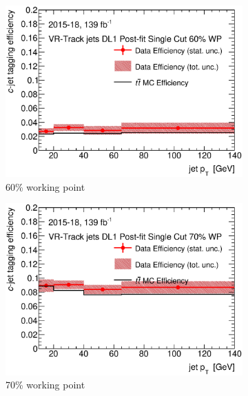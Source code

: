 \newpage
\begin{figure}[H]
	\centering
	\begin{subfigure}[t]{.35\linewidth}
		\includegraphics[width=1\textwidth]{FTAG_plots/DL1allVRJetsDec/eff60.eps}
		\caption{60\% working point}
			\end{subfigure}
		\begin{subfigure}[t]{.35\linewidth}
			\includegraphics[width=1\textwidth]{FTAG_plots/DL1allVRJetsDec/eff70.eps}
			\caption{70\% working point}
		\end{subfigure}
		\begin{subfigure}[t]{.35\linewidth}

\end{subfigure}
\end{figure}

